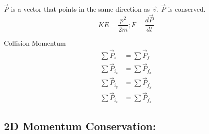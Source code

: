 \documentclass{article}
\begin{document}
$ \vec{P} $ is a vector that points in the same direction as $ \vec{v} $. $ \vec{P} $ is conserved.
$$ KE = \frac{p^2}{2m}; F = \frac{d\vec{P}}{dt} $$

Collision \textrightarrow Momentum
\begin{align}
	\sum \vec{P}_i & = \sum \vec{P}_f \\
	\sum \vec{P}_{i_x} & = \sum \vec{P}_{f_x} \\
	\sum \vec{P}_{i_y} & = \sum \vec{P}_{f_y} \\
	\sum \vec{P}_{i_z} & = \sum \vec{P}_{f_z}
\end{align}

\subsection{2D Momentum Conservation:}
\end{document}
